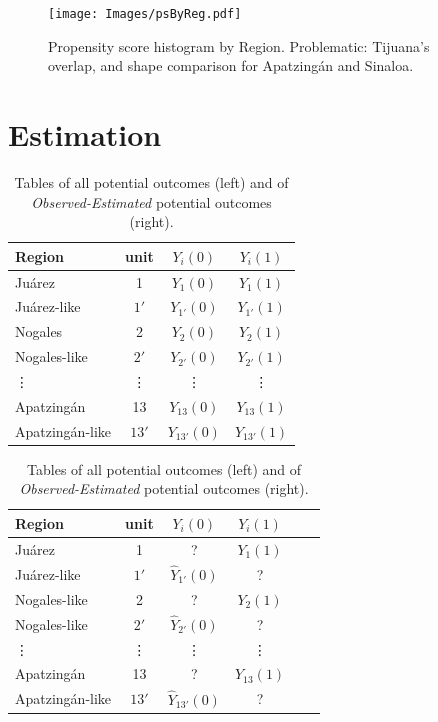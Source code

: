 \documentclass{article}[11 pt]
\begin{document}
\begin{figure}[htdp]		
	        \texttt{[image: Images/psByReg.pdf]}
	\caption{Propensity score histogram by Region. Problematic: Tijuana's overlap, and shape comparison for Apatzing\'{a}n and Sinaloa.}
\end{figure}	
			
\section{Estimation}

		\begin{table}[htdp]
		\begin{minipage}[b]{0.3\linewidth}
		    \scriptsize 
	        \begin{tabular}{|l|c|c|c|}
	            \hline
	            Region& unit& $Y_i(0)$&$Y_i(1)$\\
	            \hline
	            Ju\'{a}rez&1&$Y_1(0)$&$Y_1(1)$ \\
				 Ju\'{a}rez-like&$1'$&$Y_{1'}(0)$&$Y_{1'}(1)$ \\
				\hline
				Nogales&2&$Y_2(0)$&$Y_2(1)$ \\
				 	Nogales-like&$2'$&$Y_{2'}(0)$&$Y_{2'}(1)$ \\
				\hline
				\vdots&\vdots&\vdots&\vdots \\
				\hline
	            Apatzing\'{a}n&13&$Y_{13}(0)$&$Y_{13}(1)$ \\
				 Apatzing\'{a}n-like&$13'$&$Y_{{13}'}(0)$&$Y_{{13}'}(1)$  \\
	            \hline

	\end{tabular}
\end{minipage}
\hspace{0.9cm}
\begin{minipage}[b]{0.3\linewidth}
		    \scriptsize
		        \begin{tabular}{|l|c|c|c|c|c|}
		            \hline
		            Region& unit& $Y_i(0)$&$Y_i(1)$\\
		            \hline
		            Ju\'{a}rez&1&?&$Y_1(1)$ \\
					 Ju\'{a}rez-like&$1'$&$\hat{Y}_{1'}(0)$&? \\
					\hline
					Nogales-like&2&?&$Y_2(1)$ \\
						Nogales-like &$2'$&$\hat{Y}_{2'}(0)$&? \\
						\hline
					\vdots&\vdots&\vdots&\vdots \\
					\hline
		            Apatzing\'{a}n&13&?&$Y_{13}(1)$ \\
					 Apatzing\'{a}n-like&$13'$&$\hat{Y}_{13'}(0)$&? \\
		            \hline
		        \end{tabular}

					\end{minipage}
					   \caption{Tables of all potential outcomes (left)  and of \emph{Observed-Estimated} potential outcomes (right).}
    \label{Tab3}
\end{table}			
\end{document}

